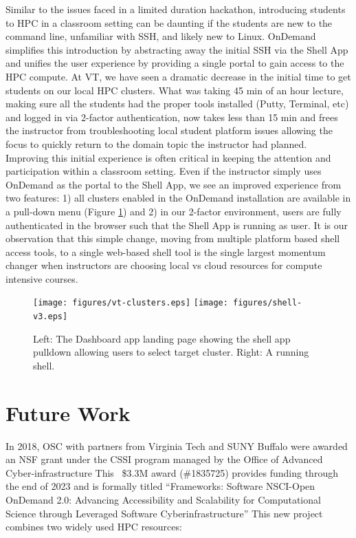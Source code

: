 \documentclass[runningheads]{llncs}
\begin{document}
Similar to the issues faced in a limited duration hackathon, introducing students to HPC in a classroom setting can be daunting if the students are new to the command line, unfamiliar with SSH, and likely new to Linux.  OnDemand simplifies this introduction by abstracting away the initial SSH via the Shell App and unifies the user experience by providing a single portal to gain access to the HPC compute.  At VT, we have seen a dramatic decrease in the initial time to get students on our local HPC clusters.  What was taking 45 min of an hour lecture, making sure all the students had the proper tools installed (Putty, Terminal, etc) and logged in via 2-factor authentication, now takes less than 15 min and frees the instructor from troubleshooting local student platform issues allowing the focus to quickly return to the domain topic the instructor had planned.  Improving this initial experience is often critical in keeping the attention and participation within a classroom setting.  Even if the instructor simply uses OnDemand as the portal to the Shell App, we see an improved experience from two features: 1) all clusters enabled in the OnDemand installation are available in a pull-down menu (Figure \ref{fig-shellapp}) and 2) in our 2-factor environment, users are fully authenticated in the browser such that the Shell App is running as user.  It is our observation that this simple change, moving from multiple platform based shell access tools, to a single web-based shell tool is the single largest momentum changer when instructors are choosing local vs cloud resources for compute intensive courses.

\begin{figure}[H]
\centering
\texttt{[image: figures/vt-clusters.eps]}
\hfill %
\texttt{[image: figures/shell-v3.eps]}
\caption{Left: The Dashboard app landing page showing the shell app pulldown allowing users to select target cluster. Right: A running shell.} \label{fig-shellapp}
\end{figure}

\section{Future Work}

In 2018, OSC with partners from Virginia Tech and SUNY Buffalo were awarded an NSF grant under the CSSI program managed by the Office of Advanced Cyber-infrastructure This ~\$3.3M award (\#1835725) provides funding through the end of 2023 and is formally titled “Frameworks: Software NSCI-Open OnDemand 2.0: Advancing Accessibility and Scalability for Computational Science through Leveraged Software Cyberinfrastructure” This new project combines two widely used HPC resources:
\end{document}

